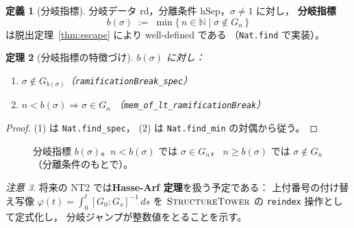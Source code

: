 \documentclass[a4paper,11pt]{ltjsarticle}
\theoremstyle{definition}
\newtheorem{definition}{定義}[section]
\theoremstyle{plain}
\newtheorem{theorem}[definition]{定理}
\theoremstyle{remark}
\newtheorem{remark}[definition]{注意}
\begin{document}
\begin{definition}[分岐指標]\label{def:ramification-break}
  分岐データ $\mathrm{rd}$，分離条件 $\mathrm{hSep}$，$\sigma \neq 1$ に対し，
  \textbf{分岐指標}
  \[
    b(\sigma) \;:=\; \min\bigl\{\,n \in \mathbb{N} \mid \sigma \notin G_n\,\bigr\}
  \]
  は脱出定理~\ref{thm:escape} により well-defined である
  （\texttt{Nat.find} で実装）。
\end{definition}

\begin{theorem}[分岐指標の特徴づけ]\label{thm:break-spec}
  $b(\sigma)$ に対し：
  \begin{enumerate}
    \item $\sigma \notin G_{b(\sigma)}$（\texttt{ramificationBreak\_spec}）
    \item $n < b(\sigma) \Rightarrow \sigma \in G_n$
      （\texttt{mem\_of\_lt\_ramificationBreak}）
  \end{enumerate}
\end{theorem}

\begin{proof}
  (1) は \texttt{Nat.find\_spec}，
  (2) は \texttt{Nat.find\_min} の対偶から従う。
\end{proof}

\begin{figure}[H]
\centering
{}
\caption{分岐指標 $b(\sigma)$。$n < b(\sigma)$ では $\sigma \in G_n$，
$n \geq b(\sigma)$ では $\sigma \notin G_n$（分離条件のもとで）。}
\label{fig:ramification-break}
\end{figure}

\begin{remark}
将来の NT2 では\textbf{Hasse-Arf 定理}を扱う予定である：
上付番号の付け替え写像
$\varphi(t) = \int_0^t [G_0 : G_s]^{-1}\,ds$
を $\textsc{StructureTower}$ の \texttt{reindex} 操作として定式化し，
分岐ジャンプが整数値をとることを示す。
\end{remark}
\end{document}
